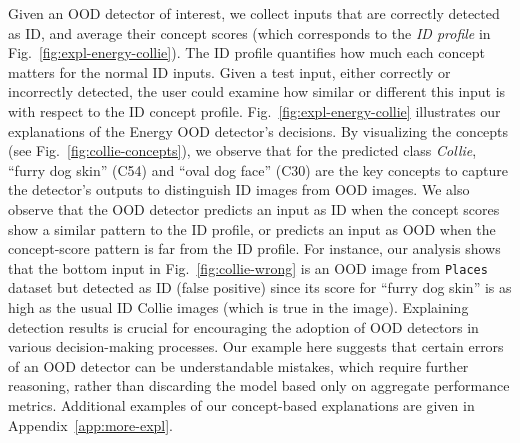 Given an OOD detector of interest, we collect inputs that are correctly detected as ID, and average their concept scores (which corresponds to the \textit{ID profile} in Fig.~\ref{fig:expl-energy-collie}).
The ID profile quantifies how much each concept matters for the normal ID inputs.
Given a test input, either correctly or incorrectly detected, the user could examine how similar or different this input is with respect to the ID concept profile.
Fig.~\ref{fig:expl-energy-collie} illustrates our explanations of the Energy OOD detector's decisions.
By visualizing the concepts (see Fig.~\ref{fig:collie-concepts}), we observe that for the predicted class \textit{Collie}, ``furry dog skin'' (C54) and ``oval dog face'' (C30) are the key concepts to capture the detector's outputs to distinguish ID images from OOD images.
We also observe that the OOD detector predicts an input as ID when the concept scores show a similar pattern to the ID profile, or predicts an input as OOD when the concept-score pattern is far from the ID profile.
For instance, our analysis shows that the bottom input in Fig.~\ref{fig:collie-wrong} is an OOD image from \texttt{Places} dataset but detected as ID (false positive) since its score for ``furry dog skin'' is as high as the usual ID Collie images (which is true in the image). 
Explaining detection results is crucial for encouraging the adoption of OOD detectors in various decision-making processes.
Our example here suggests that certain errors of an OOD detector can be understandable mistakes, which require further reasoning, rather than discarding the model based only on aggregate performance  metrics.
Additional examples of our concept-based explanations are given in Appendix~\ref{app:more-expl}.

